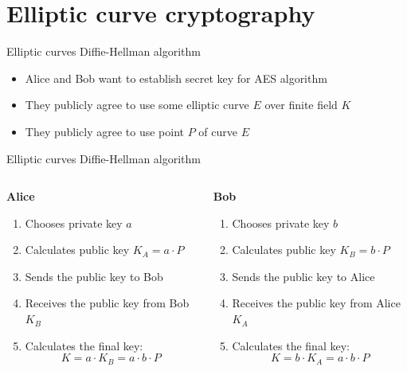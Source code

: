 \documentclass[aspectratio=169,xcolor=dvipsnames]{beamer}
\begin{document}

\section{Elliptic curve cryptography}

\begin{frame}{Elliptic curves Diffie-Hellman algorithm}
    \begin{itemize}
    \item Alice and Bob want to establish secret key for AES algorithm
    \item They publicly agree to use some elliptic curve $E$ over finite field $K$
    \item They publicly agree to use point $P$ of curve $E$
\end{itemize}
\end{frame}


\begin{frame}{Elliptic curves Diffie-Hellman algorithm}
\begin{columns}
    \begin{column}{0.5\textwidth}
        \centerline{\textbf{Alice}}
        \begin{enumerate}
            \item Chooses private key $a$
            \item Calculates public key $K_A = a \cdot P$
            \item Sends the public key to Bob
            \item Receives the public key from Bob $K_B$
            \item Calculates the final key:
            $$K = a \cdot K_B = a\cdot b \cdot P$$
        \end{enumerate}
    \end{column}
    \begin{column}{0.5\textwidth}
        \centerline{\textbf{Bob}}
        \begin{enumerate}
            \item Chooses private key $b$
            \item Calculates public key $K_B = b \cdot P$
            \item Sends the public key to Alice
            \item Receives the public key from Alice $K_A$
            \item Calculates the final key:
            $$K =  b \cdot K_A = a \cdot b \cdot P$$
        \end{enumerate}
    \end{column}
\end{columns}
\end{frame}
\end{document}
